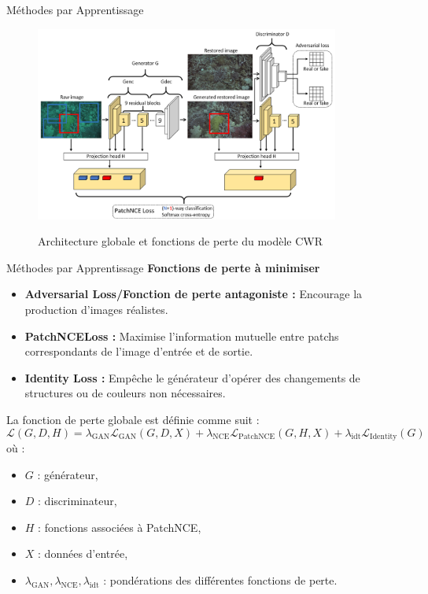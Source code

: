 \documentclass[8pt,a4paper]{beamer}
\numberwithin{figure}{section}
\begin{document}
\begin{frame}{Méthodes par Apprentissage}
\begin{center}
\begin{figure}[h!]
\includegraphics[width=10cm]{image015.png}
\label{fig2}
\caption{Architecture globale et fonctions de perte du modèle CWR}
\end{figure} 
\end{center}
\end{frame}

\begin{frame}{Méthodes par Apprentissage}
\textbf{Fonctions de perte à minimiser}
\vspace{2mm}
\begin{itemize}
    \item \textbf{Adversarial Loss/Fonction de perte antagoniste :} Encourage la production d’images réalistes.
    \item \textbf{PatchNCELoss :} Maximise l’information mutuelle entre patchs correspondants de l’image d’entrée et de sortie.
    \item \textbf{Identity Loss :} Empêche le générateur d’opérer des changements de structures ou de couleurs non nécessaires.
\end{itemize}

La fonction de perte globale est définie comme suit :
\[
\mathcal{L}(G, D, H) = \lambda_{\text{GAN}} \mathcal{L}_{\text{GAN}}(G, D, X) 
+ \lambda_{\text{NCE}} \mathcal{L}_{\text{PatchNCE}}(G, H, X) 
+ \lambda_{\text{idt}} \mathcal{L}_{\text{Identity}}(G)
\]
où :
\begin{itemize}
    \item \( G \) : générateur,
    \item \( D \) : discriminateur,
    \item \( H \) : fonctions associées à PatchNCE,
    \item \( X \) : données d'entrée,
    \item \( \lambda_{\text{GAN}}, \lambda_{\text{NCE}}, \lambda_{\text{idt}} \) : pondérations des différentes fonctions de perte.
\end{itemize}
\end{frame}
\end{document}
